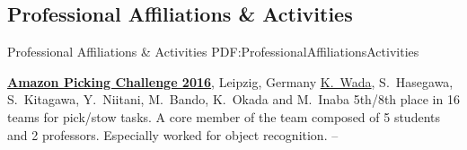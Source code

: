 \documentclass[letterpaper,MMMyyyy,nonstop]{simpleresumecv}
\begin{document}
\begin{body}
%
%
%
%


\section
{Professional Affiliations\newline
\& Activities}
{Professional Affiliations \& Activities}
{PDF:ProfessionalAffiliationsActivities}

\href{https://www.amazonrobotics.com/#/pickingchallenge}
{\textbf{Amazon Picking Challenge 2016}},
Leipzig, Germany
\GapNoBreak
\BulletItem
\underline{K.~Wada}, S.~Hasegawa, S.~Kitagawa, Y.~Niitani, M.~Bando, K.~Okada and M.~Inaba
\BulletItem
5th/8th place in 16 teams for pick/stow tasks.
\BulletItem
A core member of the team composed of 5 students and 2 professors.
\BulletItem
Especially worked for object recognition.
\hfill
{} --


\end{body}
\end{document}
